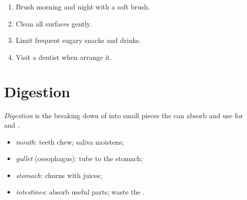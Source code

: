 \begin{method}\label{met:g3:teeth:care}
\begin{enumerate}
  \item Brush morning and night with a soft brush.
  \item Clean all surfaces gently.
  \item Limit frequent sugary snacks and drinks.
  \item Visit a dentist when  arrange it.
\end{enumerate}
\end{method}

\section{Digestion}

\begin{definition}[Digestion]\label{def:g3:teeth:digestion}
\emph{Digestion} is the breaking down of  into
small pieces the  can absorb and use for  and .
\end{definition}


\begin{definition}\label{def:g3:teeth:path}
\begin{itemize}
  \item \emph{mouth}: teeth chew; saliva moistens;
  \item \emph{gullet} (oesophagus): tube to the
        stomach;
  \item \emph{stomach}: churns  with juices;
  \item \emph{intestines}: absorb useful parts;
        waste  the .
\end{itemize}
\end{definition}

